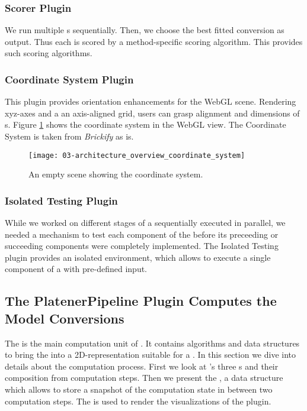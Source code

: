 \documentclass[../ClassicThesis.tex]{subfiles}
\begin{document}
\subsubsection{Scorer Plugin}

We run multiple {\fabmethod}s sequentially. Then, we choose
the best fitted conversion as output. Thus each {\fabmethod}
is scored by a method-specific scoring algorithm. This
 provides such scoring algorithms.

\subsubsection{Coordinate System Plugin}

This plugin provides orientation enhancements for the WebGL
scene. Rendering xyz-axes and a an axis-aligned grid, users
can grasp alignment and dimensions of {\threedmodel}s.
Figure \ref{fig:architecture_overview_coordinate_system}
shows the coordinate system in the WebGL view. The
Coordinate System is taken from \emph{Brickify} as
is\cite{}.

\begin{figure}
  \texttt{[image: 03-architecture\_overview\_coordinate\_system]}
  \caption{An empty scene showing the coordinate system.}
  \label{fig:architecture_overview_coordinate_system}
\end{figure}

\subsubsection{Isolated Testing Plugin}

While we worked on different stages of a sequentially
executed {\fabmethod} in parallel, we needed a mechanism to
test each component of the {\fabmethod} before its
preceeding or succeeding components were completely
implemented. The Isolated Testing plugin provides an
isolated environment, which allows to execute a single
component of a {\fabmethod} with pre-defined input.

\subsection{The PlatenerPipeline Plugin Computes the Model
  Conversions}
\label{sec:platener-pipeline-plugin}


The  is the main computation unit of
{\platener}. It contains algorithms and data structures to
bring the {\threedmodel} into a 2D-representation suitable
for a {\lasercutter}. In this section we dive into details
about the computation process. First we look at {\platener}'s
three {\fabmethod}s and their composition from computation steps.
Then we present the , a data structure
which allows to store a snapshot of the computation state in
between two computation steps. The  is
used to render the visualizations of the
 plugin.
\end{document}
